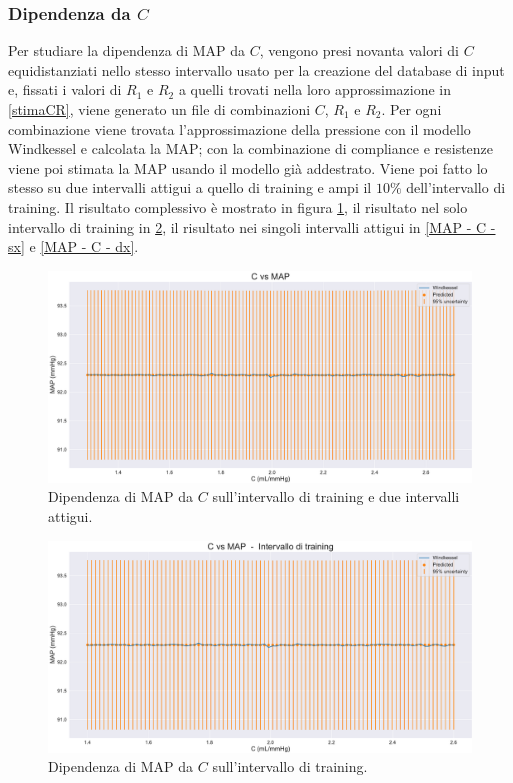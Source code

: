 \subsubsection{Dipendenza da $C$}
Per studiare la dipendenza di MAP da $C$, vengono presi novanta valori di $C$ equidistanziati nello stesso intervallo usato per la creazione del database di input e, fissati i valori di $R_1$ e $R_2$ a quelli trovati nella loro approssimazione in \ref{stimaCR}, viene generato un file di combinazioni $C$, $R_1$ e $R_2$. Per ogni combinazione viene trovata l'approssimazione della pressione con il modello Windkessel e calcolata la MAP; con la combinazione di compliance e resistenze viene poi stimata la MAP usando il modello già addestrato. Viene poi fatto lo stesso su due intervalli attigui a quello di training e ampi il $10\%$ dell'intervallo di training. Il risultato complessivo è mostrato in figura \ref{MAP - C - full}, il risultato nel solo intervallo di training in \ref{MAP - C - training}, il risultato nei singoli intervalli attigui in \ref{MAP - C - sx} e \ref{MAP - C - dx}.

\begin{figure}
    \centering
    \includegraphics[width=1\textwidth]{images/Training (risultati)/MAP/MAP - C - full.pdf}
    \caption{Dipendenza di MAP da $C$ sull'intervallo di training e due intervalli attigui.}
    \label{MAP - C - full}
\end{figure}


\begin{figure}
    \centering
    \includegraphics[width=1\textwidth]{images/Training (risultati)/MAP/MAP - C - training.pdf}
    \caption{Dipendenza di MAP da $C$ sull'intervallo di training.}
    \label{MAP - C - training}
\end{figure}


